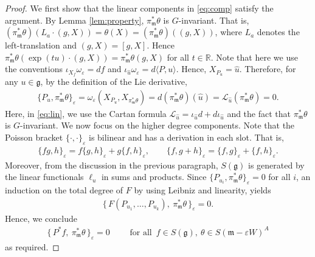 \documentclass[11pt]{amsart}
\theoremstyle{definition}
\theoremstyle{plain}
\theoremstyle{conclusion}
\begin{document}
\begin{proof}
We first show that the linear components in \eqref{eq:comp} satisfy the argument. By Lemma \ref{lem:property}, $\pi_{\mathfrak{m}}^*\theta$ is $G$-invariant. That is, $(\pi_{\mathfrak{m}}^*\theta)(L_a\cdot (g,X))=\theta(X)=(\pi_{\mathfrak{m}}^*\theta)((g,X))$, where $L_a$ denotes the left-translation and $(g,X) = [g,X]$. Hence $\pi_\mathfrak{m}^*\theta ( \exp(tu)\cdot (g,X)) = \pi_\mathfrak{m}^* \theta(g,X)$ for all $ t \in \mathbb{R}$. Note that here we use the conventions $\iota_{X_f} \omega_\varepsilon = df $ and $\iota_{\hat{u}} \omega_{\varepsilon} = d\langle P,u \rangle$. 
Hence, $X_{P_u} = \widehat{u}$. Therefore, for any $u\in\mathfrak{g}$, by the definition of the Lie derivative, \begin{align}
\{P_u,\pi_{\mathfrak{m}}^*\theta\}_\varepsilon =\omega_\varepsilon(X_{P_u},X_{\pi_{\mathfrak{m}}^*\theta}) =d(\pi_{\mathfrak{m}}^*\theta)(\hat{u}) =\mathcal{L}_{\hat{u}} (\pi_{\mathfrak{m}}^*\theta) %
= 0. \label{eq:lin}
\end{align} Here, in \eqref{eq:lin}, we use the Cartan formula $\mathcal{L}_{\hat{u}} = \iota_{\hat{u}}d +  d \iota_{\hat{u}}$ and the fact that $\pi_\mathfrak{m}^*\theta$ is $G$-invariant. We now focus on the higher degree components.  Note that the Poisson bracket $\{\cdot,\cdot\}_\varepsilon$ is bilinear and has a derivation in each slot. That is,
\begin{align*}
\{fg,h\}_\varepsilon=f\{g,h\}_\varepsilon+g\{f,h\}_\varepsilon,\qquad \{f,g+h\}_\varepsilon=\{f,g\}_{\varepsilon}+\{f,h\}_\varepsilon.
\end{align*}  Moreover, from the discussion in the previous paragraph, $S(\mathfrak{g})$ is generated by the linear functionals $\ell_u$ in sums and products. Since $\{P_{u_i},\pi_{\mathfrak{m}}^*\theta\}_\varepsilon=0$ for all $i$, an induction on the total degree of $F$ by using Leibniz and linearity, yields \begin{align*}
\{\,F(P_{u_1},\ldots,P_{u_k}),\ \pi_{\mathfrak{m}}^*\theta\,\}_\varepsilon=0.
\end{align*} Hence, we conclude  \begin{align*}
\{\,P^*f,\ \pi_{\mathfrak{m}}^*\theta\,\}_\varepsilon=0\qquad\text{ for all }\,f\in S(\mathfrak{g}),\ \theta\in S(\mathfrak{m}-\varepsilon W)^A 
\end{align*} as required.
\end{proof}
\end{document}
